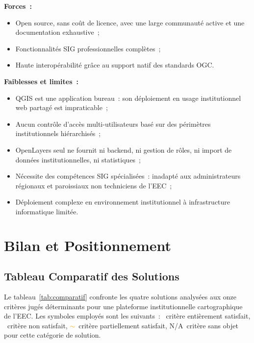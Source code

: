\documentclass[12pt, a4paper]{report}
\newcommand{\oui}{\textcolor{eecgreen}{\ding{51}}}
\newcommand{\non}{\textcolor{red}{\ding{55}}}
\newcommand{\partiel}{\textcolor{orange}{$\sim$}}
\begin{document}
\noindent\textbf{Forces~:}
\begin{itemize}[itemsep=2pt, topsep=4pt, leftmargin=1.5cm]
  \item Open source, sans coût de licence, avec une large communauté active et
    une documentation exhaustive~;
  \item Fonctionnalités SIG professionnelles complètes~;
  \item Haute interopérabilité grâce au support natif des standards OGC.
\end{itemize}

\noindent\textbf{Faiblesses et limites~:}
\begin{itemize}[itemsep=2pt, topsep=4pt, leftmargin=1.5cm]
  \item QGIS est une application bureau~: son déploiement en usage institutionnel
    web partagé est impraticable~;
  \item Aucun contrôle d'accès multi-utilisateurs basé sur des périmètres
    institutionnels hiérarchisés~;
  \item OpenLayers seul ne fournit ni backend, ni gestion de rôles, ni import de
    données institutionnelles, ni statistiques~;
  \item Nécessite des compétences SIG spécialisées~: inadapté aux administrateurs
    régionaux et paroissiaux non techniciens de l'EEC~;
  \item Déploiement complexe en environnement institutionnel à infrastructure
    informatique limitée.
\end{itemize}

\section{Bilan et Positionnement}
\label{sec:bilan}

\subsection{Tableau Comparatif des Solutions}

Le tableau~\ref{tab:comparatif} confronte les quatre solutions analysées aux onze
critères jugés déterminants pour une plateforme institutionnelle cartographique de
l'EEC. Les symboles employés sont les suivants~: \oui~critère entièrement satisfait,
\non~critère non satisfait, \partiel~critère partiellement satisfait, N/A~critère
sans objet pour cette catégorie de solution.
\end{document}
